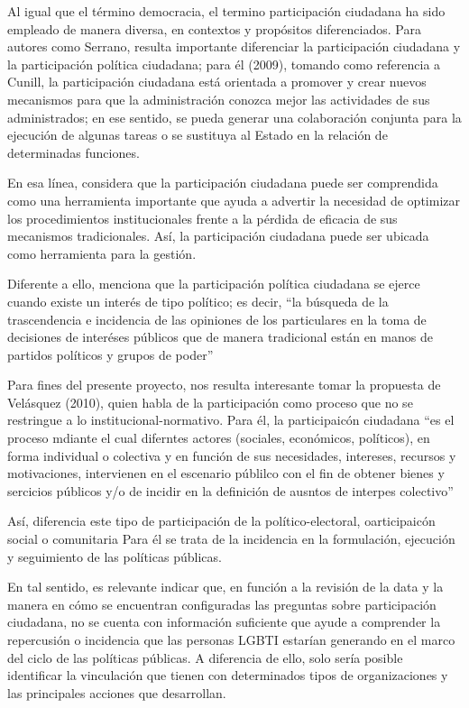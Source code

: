 \documentclass[
]{book}
\theoremstyle{definition}
\theoremstyle{definition}
\theoremstyle{definition}
\theoremstyle{definition}
\theoremstyle{remark}
\begin{document}
Al igual que el término democracia, el termino participación ciudadana ha sido empleado de manera diversa, en contextos y propósitos diferenciados. Para autores como Serrano, resulta importante diferenciar la participación ciudadana y la participación política ciudadana; para él (2009), tomando como referencia a Cunill, la participación ciudadana está orientada a promover y crear nuevos mecanismos para que la administración conozca mejor las actividades de sus administrados; en ese sentido, se pueda generar una colaboración conjunta para la ejecución de algunas tareas o se sustituya al Estado en la relación de determinadas funciones.

En esa línea, considera que la participación ciudadana puede ser comprendida como una herramienta importante que ayuda a advertir la necesidad de optimizar los procedimientos institucionales frente a la pérdida de eficacia de sus mecanismos tradicionales. Así, la participación ciudadana puede ser ubicada como herramienta para la gestión.

Diferente a ello, menciona que la participación política ciudadana se ejerce cuando existe un interés de tipo político; es decir, ``la búsqueda de la trascendencia e incidencia de las opiniones de los particulares en la toma de decisiones de interéses públicos que de manera tradicional están en manos de partidos políticos y grupos de poder''

Para fines del presente proyecto, nos resulta interesante tomar la propuesta de Velásquez (2010), quien habla de la participación como proceso que no se restringue a lo institucional-normativo. Para él, la participaicón ciudadana ``es el proceso mdiante el cual diferntes actores (sociales, económicos, políticos), en forma individual o colectiva y en función de sus necesidades, intereses, recursos y motivaciones, intervienen en el escenario públilco con el fin de obtener bienes y sercicios públicos y/o de incidir en la definición de ausntos de interpes colectivo''

Así, diferencia este tipo de participación de la político-electoral, oarticipaicón social o comunitaria Para él se trata de la incidencia en la formulación, ejecución y seguimiento de las políticas públicas.

En tal sentido, es relevante indicar que, en función a la revisión de la data y la manera en cómo se encuentran configuradas las preguntas sobre participación ciudadana, no se cuenta con información suficiente que ayude a comprender la repercusión o incidencia que las personas LGBTI estarían generando en el marco del ciclo de las políticas públicas. A diferencia de ello, solo sería posible identificar la vinculación que tienen con determinados tipos de organizaciones y las principales acciones que desarrollan.
\end{document}
